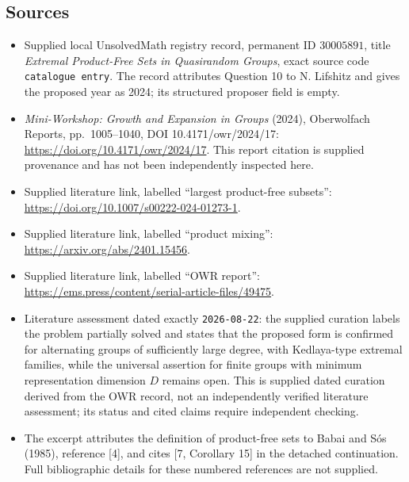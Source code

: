 \documentclass[11pt]{article}
\begin{document}
\subsection{Sources}
\begin{itemize}
\item Supplied local UnsolvedMath registry record, permanent ID \(30005891\), title \emph{Extremal Product-Free Sets in Quasirandom Groups}, exact source code \texttt{catalogue entry}. The record attributes Question 10 to N. Lifshitz and gives the proposed year as 2024; its structured proposer field is empty.
\item \emph{Mini-Workshop: Growth and Expansion in Groups} (2024), Oberwolfach Reports, pp.~1005--1040, DOI 10.4171/owr/2024/17: \url{https://doi.org/10.4171/owr/2024/17}. This report citation is supplied provenance and has not been independently inspected here.
\item Supplied literature link, labelled ``largest product-free subsets'': \url{https://doi.org/10.1007/s00222-024-01273-1}.
\item Supplied literature link, labelled ``product mixing'': \url{https://arxiv.org/abs/2401.15456}.
\item Supplied literature link, labelled ``OWR report'': \url{https://ems.press/content/serial-article-files/49475}.
\item Literature assessment dated exactly \texttt{2026-08-22}: the supplied curation labels the problem partially solved and states that the proposed form is confirmed for alternating groups of sufficiently large degree, with Kedlaya-type extremal families, while the universal assertion for finite groups with minimum representation dimension \(D\) remains open. This is supplied dated curation derived from the OWR record, not an independently verified literature assessment; its status and cited claims require independent checking.
\item The excerpt attributes the definition of product-free sets to Babai and S\'os (1985), reference [4], and cites [7, Corollary 15] in the detached continuation. Full bibliographic details for these numbered references are not supplied.
\end{itemize}
\end{document}
